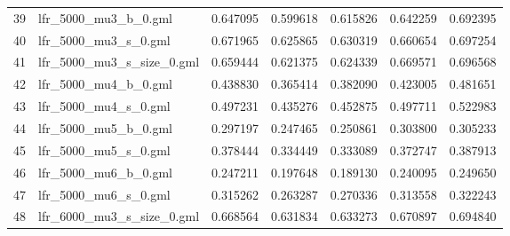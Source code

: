 \begin{tabular}{llrrrrr}
39 &        lfr\_5000\_mu3\_b\_0.gml &                          0.647095 &                             0.599618 &                            0.615826 &                           0.642259 &                        0.692395 \\
40 &        lfr\_5000\_mu3\_s\_0.gml &                          0.671965 &                             0.625865 &                            0.630319 &                           0.660654 &                        0.697254 \\
41 &   lfr\_5000\_mu3\_s\_size\_0.gml &                          0.659444 &                             0.621375 &                            0.624339 &                           0.669571 &                        0.696568 \\
42 &        lfr\_5000\_mu4\_b\_0.gml &                          0.438830 &                             0.365414 &                            0.382090 &                           0.423005 &                        0.481651 \\
43 &        lfr\_5000\_mu4\_s\_0.gml &                          0.497231 &                             0.435276 &                            0.452875 &                           0.497711 &                        0.522983 \\
44 &        lfr\_5000\_mu5\_b\_0.gml &                          0.297197 &                             0.247465 &                            0.250861 &                           0.303800 &                        0.305233 \\
45 &        lfr\_5000\_mu5\_s\_0.gml &                          0.378444 &                             0.334449 &                            0.333089 &                           0.372747 &                        0.387913 \\
46 &        lfr\_5000\_mu6\_b\_0.gml &                          0.247211 &                             0.197648 &                            0.189130 &                           0.240095 &                        0.249650 \\
47 &        lfr\_5000\_mu6\_s\_0.gml &                          0.315262 &                             0.263287 &                            0.270336 &                           0.313558 &                        0.322243 \\
48 &   lfr\_6000\_mu3\_s\_size\_0.gml &                          0.668564 &                             0.631834 &                            0.633273 &                           0.670897 &                        0.694840 \\

\end{tabular}
